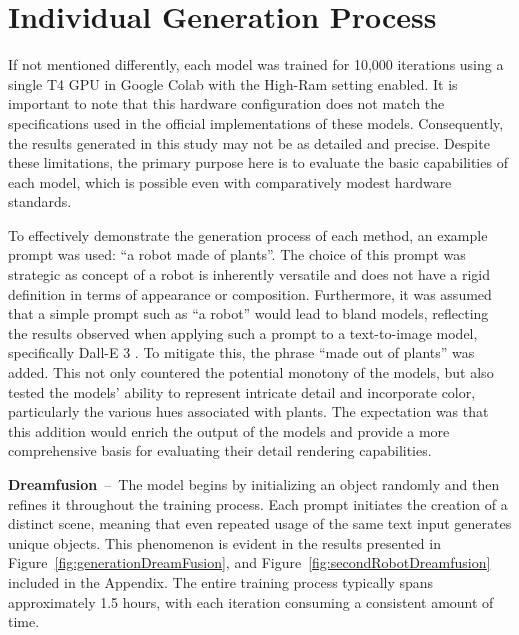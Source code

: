 \section{Individual Generation Process}\label{generationProcess}

If not mentioned differently, each model was trained for 10,000 iterations using a single T4 GPU in Google Colab with the High-Ram setting enabled. It is important to note that this hardware configuration does not match the specifications used in the official implementations of these models. Consequently, the results generated in this study may not be as detailed and precise. Despite these limitations, the primary purpose here is to evaluate the basic capabilities of each model, which is possible even with comparatively modest hardware standards.

To effectively demonstrate the generation process of each method, an example prompt was used: ``a robot made of plants''. The choice of this prompt was strategic as concept of a robot is inherently versatile and does not have a rigid definition in terms of appearance or composition. Furthermore, it was assumed that a simple prompt such as ``a robot'' would lead to bland models, reflecting the results observed when applying such a prompt to a text-to-image model, specifically Dall-E 3 \citep{dalle3}. To mitigate this, the phrase ``made out of plants'' was added. This not only countered the potential monotony of the models, but also tested the models' ability to represent intricate detail and incorporate color, particularly the various hues associated with plants. The expectation was that this addition would enrich the output of the models and provide a more comprehensive basis for evaluating their detail rendering capabilities.

\textbf{Dreamfusion}~--~The model begins by initializing an object randomly and then refines it throughout the training process. Each prompt initiates the creation of a distinct scene, meaning that even repeated usage of the same text input generates unique objects. This phenomenon is evident in the results presented in Figure~\ref{fig:generationDreamFusion}, and Figure~\ref{fig:secondRobotDreamfusion} included in the Appendix. The entire training process typically spans approximately 1.5 hours, with each iteration consuming a consistent amount of time.

